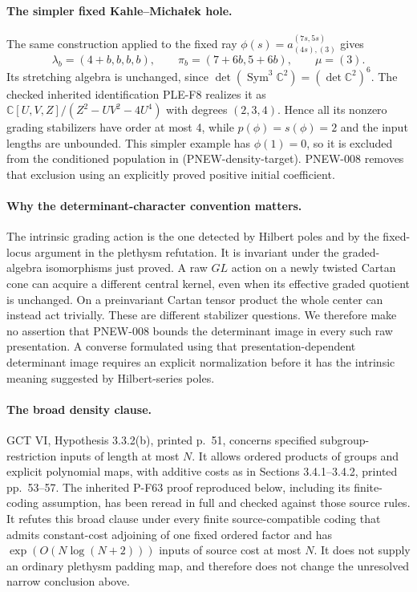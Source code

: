 \paragraph{The simpler fixed Kahle--Micha\l ek hole.}
The same construction applied to the fixed ray
$\phi(s)=a_{(4s),(3)}^{(7s,5s)}$ gives
\[
       \lambda_b=(4+b,b,b,b),\qquad
       \pi_b=(7+6b,5+6b),\qquad\mu=(3).
\]
Its stretching algebra is unchanged, since
$\det(\operatorname{Sym}^3\mathbb C^2)=(\det\mathbb C^2)^6$.
The checked inherited identification PLE-F8 realizes it as
$\mathbb C[U,V,Z]/(Z^2-UV^2-4U^4)$ with degrees $(2,3,4)$.
Hence all its nonzero grading stabilizers have order at most
4, while $p(\phi)=s(\phi)=2$ and the input lengths are unbounded.
This simpler example has $\phi(1)=0$, so it is excluded from
the conditioned population in (PNEW-density-target).  PNEW-008
removes that exclusion using an explicitly proved positive initial
coefficient.

\paragraph{Why the determinant-character convention matters.}
The intrinsic grading action is the one detected by Hilbert poles
and by the fixed-locus argument in the plethysm refutation.
It is invariant under the graded-algebra isomorphisms just proved.
A raw $GL$ action on a newly twisted Cartan cone can acquire a
different central kernel, even when its effective graded quotient
is unchanged.  On a preinvariant Cartan tensor product the whole
center can instead act trivially.  These are different stabilizer
questions.  We therefore make no assertion that PNEW-008 bounds
the determinant image in every such raw presentation.  A converse
formulated using that presentation-dependent determinant image
requires an explicit normalization before it has the intrinsic
meaning suggested by Hilbert-series poles.

\paragraph{The broad density clause.}
GCT VI, Hypothesis 3.3.2(b), printed p.~51, concerns specified
subgroup-restriction inputs of length at most $N$.  It allows
ordered products of groups and explicit polynomial maps, with
additive costs as in Sections 3.4.1--3.4.2, printed pp.~53--57.
The inherited P-F63 proof reproduced below, including its
finite-coding assumption, has been reread in full and checked
against those source rules.  It refutes this broad clause under
every finite source-compatible coding that admits constant-cost
adjoining of one fixed ordered factor and has
$\exp(O(N\log(N+2)))$ inputs of source cost at most $N$.
It does not supply an ordinary plethysm padding map, and therefore
does not change the unresolved narrow conclusion above.
